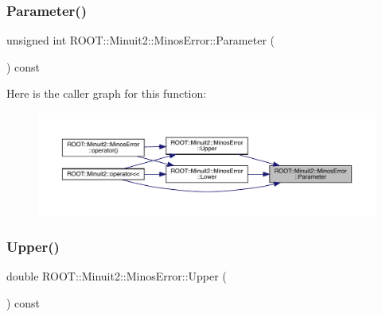 \mbox{\label{classROOT_1_1Minuit2_1_1MinosError_a5d4ac177a8075a3698dbecac3a8c552b}} 
\subsubsection{\texorpdfstring{Parameter()}{Parameter()}\hspace{0.1cm}{\footnotesize\ttfamily [3/3]}}
{\footnotesize\ttfamily unsigned int R\+O\+O\+T\+::\+Minuit2\+::\+Minos\+Error\+::\+Parameter (\begin{DoxyParamCaption}{ }\end{DoxyParamCaption}) const\hspace{0.3cm}{\ttfamily [inline]}}

Here is the caller graph for this function\+:
\nopagebreak
\begin{figure}[H]
\begin{center}
\leavevmode
\includegraphics[width=350pt]{d2/dd1/classROOT_1_1Minuit2_1_1MinosError_a5d4ac177a8075a3698dbecac3a8c552b_icgraph}
\end{center}
\end{figure}
\mbox{\label{classROOT_1_1Minuit2_1_1MinosError_a0223fde13608aadee1f15b51d15b2bf6}} 
\subsubsection{\texorpdfstring{Upper()}{Upper()}\hspace{0.1cm}{\footnotesize\ttfamily [1/3]}}
{\footnotesize\ttfamily double R\+O\+O\+T\+::\+Minuit2\+::\+Minos\+Error\+::\+Upper (\begin{DoxyParamCaption}{ }\end{DoxyParamCaption}) const\hspace{0.3cm}{\ttfamily [inline]}}


